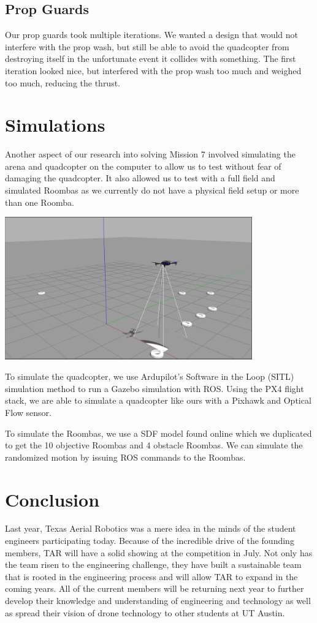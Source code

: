 \documentclass[12pt]{article}
\begin{document}
\subsection{Prop Guards}
Our prop guards took multiple iterations. We wanted a design that would not interfere with the prop wash, but still be able to avoid the quadcopter from destroying itself in the unfortunate event it collides with something. The first iteration looked nice, but interfered with the prop wash too much and weighed too much, reducing the thrust. 

\section{Simulations}
Another aspect of our research into solving Mission 7 involved simulating the arena and quadcopter on the computer to allow us to test without fear of damaging the quadcopter. It also allowed us to test with a full field and simulated Roombas as we currently do not have a physical field setup or more than one Roomba. 

\begin{center}
\includegraphics[width=0.8\textwidth]{Selection_004}
\end{center}

To simulate the quadcopter, we use Ardupilot's Software in the Loop (SITL) simulation method to run a Gazebo simulation with ROS. Using the PX4 flight stack, we are able to simulate a quadcopter like ours with a Pixhawk and Optical Flow sensor. 

To simulate the Roombas, we use a SDF model found online which we duplicated to get the 10 objective Roombas and 4 obstacle Roombas. We can simulate the randomized motion by issuing ROS commands to the Roombas. 

\section{Conclusion}
Last year, Texas Aerial Robotics was a mere idea in the minds of the student engineers participating today. Because of the incredible drive of the founding members, TAR will have a solid showing at the competition in July. Not only has the team risen to the engineering challenge, they have built a sustainable team that is rooted in the engineering process and will allow TAR to expand in the coming years. All of the current members will be returning next year to further develop their knowledge and understanding of engineering and technology as well as spread their vision of drone technology to other students at UT Austin.
\end{document}

